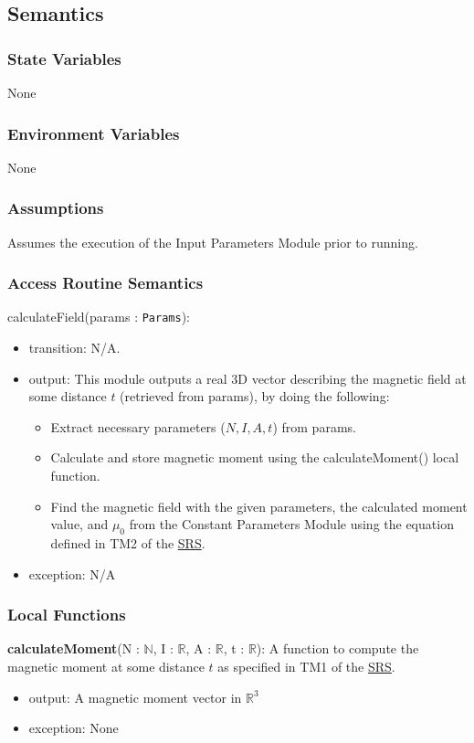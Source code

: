 \documentclass[12pt, titlepage]{article}
\begin{document}
\subsection{Semantics}

\subsubsection{State Variables}
None

\subsubsection{Environment Variables}
None

\subsubsection{Assumptions}
Assumes the execution of the Input Parameters Module prior to running. 

\subsubsection{Access Routine Semantics}

\noindent calculateField(params : \texttt{Params}):
\begin{itemize}
\item transition: N/A.
\item output: This module outputs a real 3D vector describing the magnetic field at some distance $t$ (retrieved from params), by doing the following:
\begin{itemize}
  \item Extract necessary parameters ($N, I, A, t$) from params. 
  \item Calculate and store magnetic moment using the calculateMoment() local function.
  \item Find the magnetic field with the given parameters, the calculated moment value, and $\mu_0$ from the Constant Parameters Module using the equation defined in TM2 of the \href{https://github.com/husseinsd1/optimal-em-arrangement/blob/main/docs/SRS/SRS.pdf}{SRS}. 
\end{itemize}
\item exception: N/A
\end{itemize}

\subsubsection{Local Functions}
\textbf{calculateMoment}(N : $\mathbb{N}$, I : $\mathbb{R}$, A : $\mathbb{R}$, t : $\mathbb{R}$): A function to compute the magnetic moment at some distance $t$ as specified in TM1 of the \href{https://github.com/husseinsd1/optimal-em-arrangement/blob/main/docs/SRS/SRS.pdf}{SRS}.
\begin{itemize}
  \item output: A magnetic moment vector in $\mathbb{R}^3$
  \item exception: None
\end{itemize}
\end{document}

